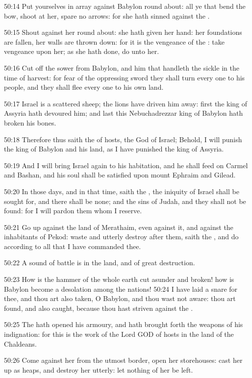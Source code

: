 50:14 Put yourselves in array against Babylon round about: all ye that
bend the bow, shoot at her, spare no arrows: for she hath sinned
against the \LORD.

50:15 Shout against her round about: she hath given her hand: her
foundations are fallen, her walls are thrown down: for it is the
vengeance of the \LORD: take vengeance upon her; as she hath done, do
unto her.

50:16 Cut off the sower from Babylon, and him that handleth the sickle
in the time of harvest: for fear of the oppressing sword they shall
turn every one to his people, and they shall flee every one to his own
land.

50:17 Israel is a scattered sheep; the lions have driven him away:
first the king of Assyria hath devoured him; and last this
Nebuchadrezzar king of Babylon hath broken his bones.

50:18 Therefore thus saith the \LORD of hosts, the God of Israel;
Behold, I will punish the king of Babylon and his land, as I have
punished the king of Assyria.

50:19 And I will bring Israel again to his habitation, and he shall
feed on Carmel and Bashan, and his soul shall be satisfied upon mount
Ephraim and Gilead.

50:20 In those days, and in that time, saith the \LORD, the iniquity of
Israel shall be sought for, and there shall be none; and the sins of
Judah, and they shall not be found: for I will pardon them whom I
reserve.

50:21 Go up against the land of Merathaim, even against it, and
against the inhabitants of Pekod: waste and utterly destroy after
them, saith the \LORD, and do according to all that I have commanded
thee.

50:22 A sound of battle is in the land, and of great destruction.

50:23 How is the hammer of the whole earth cut asunder and broken! how
is Babylon become a desolation among the nations!  50:24 I have laid a
snare for thee, and thou art also taken, O Babylon, and thou wast not
aware: thou art found, and also caught, because thou hast striven
against the \LORD.

50:25 The \LORD hath opened his armoury, and hath brought forth the
weapons of his indignation: for this is the work of the Lord GOD of
hosts in the land of the Chaldeans.

50:26 Come against her from the utmost border, open her storehouses:
cast her up as heaps, and destroy her utterly: let nothing of her be
left.

